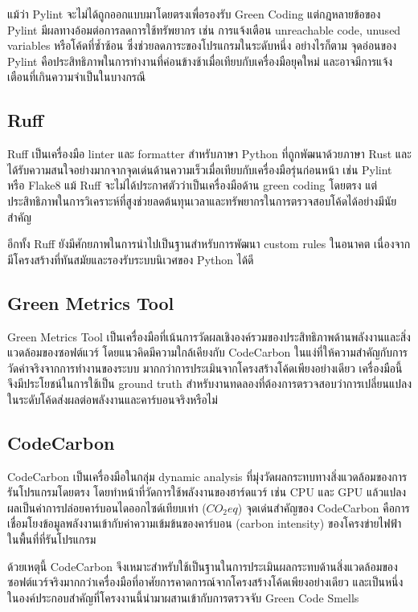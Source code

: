 แม้ว่า Pylint จะไม่ได้ถูกออกแบบมาโดยตรงเพื่อรองรับ {\italicfont Green Coding} แต่กฎหลายข้อของ Pylint มีผลทางอ้อมต่อการลดการใช้ทรัพยากร เช่น การแจ้งเตือน {\italicfont unreachable code}, {\italicfont unused variables} หรือโค้ดที่ซ้ำซ้อน ซึ่งช่วยลดภาระของโปรแกรมในระดับหนึ่ง อย่างไรก็ตาม จุดอ่อนของ Pylint คือประสิทธิภาพในการทำงานที่ค่อนข้างช้าเมื่อเทียบกับเครื่องมือยุคใหม่ และอาจมีการแจ้งเตือนที่เกินความจำเป็นในบางกรณี

\subsection{Ruff}
{\boldfont Ruff} เป็นเครื่องมือ {\italicfont linter} และ {\italicfont formatter} สำหรับภาษา Python ที่ถูกพัฒนาด้วยภาษา Rust และได้รับความสนใจอย่างมากจากจุดเด่นด้านความเร็วเมื่อเทียบกับเครื่องมือรุ่นก่อนหน้า เช่น Pylint หรือ Flake8 แม้ Ruff จะไม่ได้ประกาศตัวว่าเป็นเครื่องมือด้าน {\italicfont green coding} โดยตรง แต่ประสิทธิภาพในการวิเคราะห์ที่สูงช่วยลดต้นทุนเวลาและทรัพยากรในการตรวจสอบโค้ดได้อย่างมีนัยสำคัญ

อีกทั้ง Ruff ยังมีศักยภาพในการนำไปเป็นฐานสำหรับการพัฒนา {\italicfont custom rules} ในอนาคต เนื่องจากมีโครงสร้างที่ทันสมัยและรองรับระบบนิเวศของ Python ได้ดี

\subsection{Green Metrics Tool}
{\boldfont Green Metrics Tool} เป็นเครื่องมือที่เน้นการวัดผลเชิงองค์รวมของประสิทธิภาพด้านพลังงานและสิ่งแวดล้อมของซอฟต์แวร์ โดยแนวคิดมีความใกล้เคียงกับ CodeCarbon ในแง่ที่ให้ความสำคัญกับการวัดค่าจริงจากการทำงานของระบบ มากกว่าการประเมินจากโครงสร้างโค้ดเพียงอย่างเดียว เครื่องมือนี้จึงมีประโยชน์ในการใช้เป็น {\italicfont ground truth} สำหรับงานทดลองที่ต้องการตรวจสอบว่าการเปลี่ยนแปลงในระดับโค้ดส่งผลต่อพลังงานและคาร์บอนจริงหรือไม่

\subsection{CodeCarbon}
{\boldfont CodeCarbon} เป็นเครื่องมือในกลุ่ม {\italicfont dynamic analysis} ที่มุ่งวัดผลกระทบทางสิ่งแวดล้อมของการรันโปรแกรมโดยตรง โดยทำหน้าที่วัดการใช้พลังงานของฮาร์ดแวร์ เช่น CPU และ GPU แล้วแปลงผลเป็นค่าการปล่อยคาร์บอนไดออกไซด์เทียบเท่า ($CO_2eq$) จุดเด่นสำคัญของ CodeCarbon คือการเชื่อมโยงข้อมูลพลังงานเข้ากับค่าความเข้มข้นของคาร์บอน ({\italicfont carbon intensity}) ของโครงข่ายไฟฟ้าในพื้นที่ที่รันโปรแกรม

ด้วยเหตุนี้ CodeCarbon จึงเหมาะสำหรับใช้เป็นฐานในการประเมินผลกระทบด้านสิ่งแวดล้อมของซอฟต์แวร์จริงมากกว่าเครื่องมือที่อาศัยการคาดการณ์จากโครงสร้างโค้ดเพียงอย่างเดียว และเป็นหนึ่งในองค์ประกอบสำคัญที่โครงงานนี้นำมาผสานเข้ากับการตรวจจับ {\italicfont Green Code Smells}

